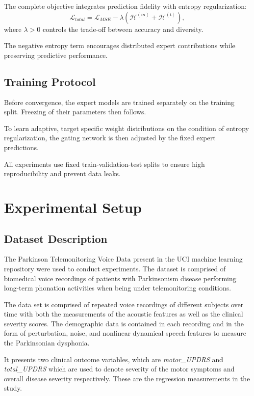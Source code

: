 \documentclass{customIEEEsingle}
\begin{document}
	The complete objective integrates prediction fidelity with entropy regularization:
	\begin{equation}
		\mathcal{L}_{total}
		=
		\mathcal{L}_{MSE}
		-
		\lambda
		\left(
		\mathcal{H}^{(m)} + \mathcal{H}^{(t)}
		\right),
	\end{equation}
	where $\lambda > 0$ controls the trade-off between accuracy and diversity.
	
	The negative entropy term encourages distributed expert contributions while preserving predictive performance.
\subsection{Training Protocol}


	Before convergence, the expert models are trained separately on the training split. Freezing of their parameters then follows.
	
	To learn adaptive, target specific weight distributions on the condition of entropy regularization, the gating network is then adjusted by the fixed expert predictions.
	
	All experiments use fixed train-validation-test splits to ensure high reproducibility and prevent data leaks.
	
	\section{Experimental Setup}\label{sec:experiments}
	\subsection{Dataset Description}
	
	The Parkinson Telemonitoring Voice Data present in the UCI machine learning repository \cite{parkinsons_telemonitoring_189} were used to conduct experiments. The dataset is comprised of biomedical voice recordings of patients with Parkinsonism disease performing long-term phonation activities when being under telemonitoring conditions.
	
	The data set is comprised of repeated voice recordings of different subjects over time with both the measurements of the acoustic features as well as the clinical severity scores. The demographic data is contained in each recording and in the form of perturbation, noise, and nonlinear dynamical speech features to measure the Parkinsonian dysphonia.
	
	It presents two clinical outcome variables, which are \textit{motor\_UPDRS} and \textit{total\_UPDRS} which are used to denote severity of the motor symptoms and overall disease severity respectively. These are the regression measurements in the study.
	
\end{document}
